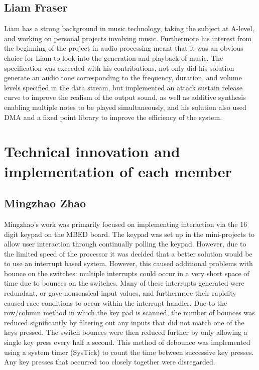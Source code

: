\subsection*{Liam Fraser}
Liam has a strong background in music technology, taking the subject at A-level,
and working on personal projects involving music. Furthermore his interest from 
the beginning of the project in audio processing meant that it was an obvious 
choice for Liam to look into the generation and playback of music. The 
specification was exceeded with his contributions, not only did his solution 
generate an audio tone corresponding to the frequency, duration, and volume 
levels specified in the data stream, but implemented an attack sustain release 
curve to improve the realism of the output sound, as well as additive synthesis 
enabling multiple notes to be played simultaneously, and his solution also 
used DMA and a fixed point library to improve the efficiency of the system. 

\section{Technical innovation and implementation of each member}
\subsection*{Mingzhao Zhao}
Mingzhao's work was primarily focused on implementing interaction via 
the 16 digit keypad on the MBED board. The keypad was set up in the mini-projects 
to allow user interaction through continually polling the keypad. However, due 
to the limited speed of the processor it was decided that a better solution 
would be to use an interrupt based system.
However, this caused additional problems with bounce on the switches: 
multiple interrupts could occur in a very short space of time due to bounces on 
the switches. Many of these interrupts generated were redundant, or gave 
nonsensical input values, and furthermore their rapidity caused race conditions 
to occur within the interrupt handler. 
Due to the row/column method in which the key pad is scanned, the 
number of bounces was reduced significantly by filtering out any inputs that 
did not match one of the keys pressed. The switch bounces were then reduced 
further by only allowing a single key press every half a second. 
This method of debounce was implemented using a system 
timer (SysTick) to count the time between successive key presses. Any key 
presses that occurred too closely together were disregarded. 

